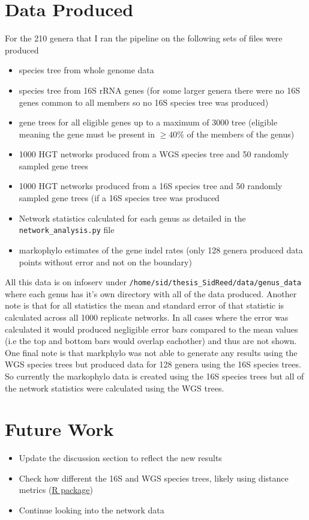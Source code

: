 \documentclass[12pt,letter]{article}
\begin{document}
\section{Data Produced}
For the 210 genera that I ran the pipeline on the following sets of files were produced
\begin{itemize}
    \item species tree from whole genome data
    \item species tree from 16S rRNA genes (for some larger genera there were no 16S genes common to all members so no 16S species tree was produced)
    \item gene trees for all eligible genes up to a maximum of 3000  tree (eligible meaning the gene must be present in $\geq 40\%$ of the members of the genus)
    \item 1000 HGT networks produced from a WGS species tree and 50 randomly sampled gene trees
    \item 1000 HGT networks produced from a 16S species tree and 50 randomly sampled gene trees (if a 16S species tree was produced
    \item Network statistics calculated for each genus as detailed in the \verb|network_analysis.py| file
    \item markophylo estimates of the gene indel rates (only 128 genera produced data points without error and not on the boundary)
\end{itemize}
All this data is on infoserv under \verb|/home/sid/thesis_SidReed/data/genus_data| where each genus has it's own directory with all of the data produced.
Another note is that for all statistics the mean and standard error of that statistic is calculated across all 1000 replicate networks.
In all cases where the error was calculated it would produced negligible error bars compared to the mean values (i.e the top and bottom bars would overlap eachother) and thus are not shown.
One final note is that markphylo was not able to generate any results using the WGS species trees but produced data for 128 genera using the 16S species trees.
So currently the markophylo data is created using the 16S species trees but all of the network statistics were calculated using the WGS trees.
\section{Future Work}
\begin{itemize}
    \item Update the discussion section to reflect the new results
    \item Check how different the 16S and WGS species trees, likely using distance metrics (\hyperlink{https://cran.r-project.org/web/packages/Quartet/vignettes/Tree-distance-metrics.pdf}{R package})
    \item Continue looking into the network data
\end{itemize}
\end{document}
